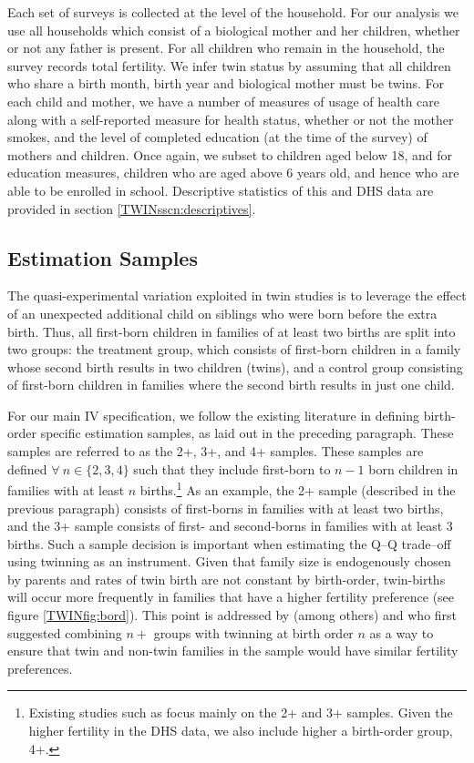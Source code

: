 \documentclass[subeqn]{article}
\begin{document}
\begin{spacing}{1.4}
Each set of surveys is collected at the level of the household.  For our 
analysis we use all households which consist of a biological mother and her 
children, whether or not any father is present.  For all children who remain in
the household, the survey records total fertility.  We infer twin status by
assuming that all children who share a birth month, birth year and biological
mother must be twins.  For each child and mother, we have a number of measures
of usage of health care along with a self-reported measure for health status, 
whether or not the mother smokes, and the level of completed education (at the 
time of the survey) of mothers and children.  Once again, we subset to children
aged below 18, and for education measures, children who are aged above 6 years
old, and hence who are able to be enrolled in school.  Descriptive statistics of
this and DHS data are provided in section \ref{TWINsscn:descriptives}.

\subsection{Estimation Samples}                    \label{TWINsscn:samples}
The quasi-experimental variation exploited in twin studies is to leverage the 
effect of an unexpected additional child on siblings who were born before the 
extra birth.  Thus, all first-born children in families of at least two births
are split into two groups: the treatment group, which consists of first-born
children in a family whose second birth results in two children (twins), and a
control group consisting of first-born children in families where the second
birth results in just one child.

For our main IV specification, we follow the existing literature in defining
birth-order specific estimation samples, as laid out in the preceding 
paragraph. These samples are referred to as the 2+, 3+, and 4+ samples. These 
samples are defined $\forall\ n \in \{2, 3, 4\}$ such that they include 
first-born to $n-1$ born children in families with at least $n$ births.\footnote{
Existing studies such as \citet{Angristetal2010} focus mainly on the 2+ and 3+ 
samples. Given the higher fertility in the DHS data, we also include higher a
birth-order group, 4+.} As an example, the 2+ sample (described in the previous
paragraph) consists of first-borns in families with at least two births, and the 
3+ sample consists of first- and second-borns in families with at least 3 births.
Such a sample decision is important when estimating the Q--Q trade--off using 
twinning as an instrument. Given that family size is endogenously chosen by 
parents and rates of twin birth are not constant by birth-order, twin-births will 
occur more frequently in families that have a higher fertility preference (see
figure \ref{TWINfig:bord}). This point is addressed by (among others) 
\citet{RosenzweigWolpin1980} and \citet{Blacketal2005} who first suggested 
combining $n+$ groups with twinning at birth order $n$ as a way to ensure that 
twin and non-twin families in the sample would have similar fertility 
preferences.


\end{spacing}
\end{document}
